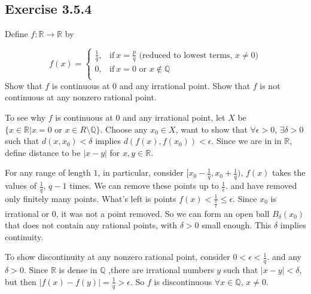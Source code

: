 \documentclass{tufte-book}
\theoremstyle{mytheoremstyle}
\theoremstyle{mylemstyle}
\theoremstyle{mydefstyle}
\begin{document}
\subsection{Exercise 3.5.4}
Define $f: \mathbb{R} \rightarrow \mathbb{R}$ by 

\[f(x) = 
\begin{cases}
      \frac{1}{q},  & \text{if}\ x = \frac{p}{q} \text{ (reduced to lowest terms,  } x \neq 0 \text{)} \\
      0, & \text{if}\ x = 0 \text{ or } x \not\in \mathbb{Q}\\
\end{cases}
\]
Show that $f$ is continuous at $0$ and any irrational point.  Show that $f$ is not continuous at any nonzero rational point.

To see why $f$ is continuous at $0$ and any irrational point, let $X$ be $\{x \in \mathbb{R} | x =0 \text{ or } x \in R \setminus \mathbb{Q}\}$.  Choose any $x_0 \in X$, want to show that $\forall \epsilon >0$, $\exists \delta > 0$ such that $d(x, x_0) < \delta$ implies $d(f(x), f(x_0)) < \epsilon$.  Since we are in in $\mathbb{R}$, define distance to be $|x - y|$ for $x, y \in \mathbb{R}$.

For any range of length $1$, in particular, consider $[x_0-\frac{1}{q}, x_0+\frac{1}{q})$, $f(x)$ takes the values of $\frac{1}{q}$, $q -1$ times.  We can remove these points up to $\frac{1}{\epsilon}$. and have removed only finitely many points.  What's left is points $f(x) < \frac{1}{\frac{1}{\epsilon}} \leq \epsilon$.  Since $x_0$ is irrational or $0$, it was not a point removed.  So we can form an open ball $B_\delta(x_0)$ that does not contain any rational points, with $\delta >0$ small enough.  This $\delta$ implies continuity.

To show discontinuity at any nonzero rational point, consider $0 < \epsilon < \frac{1}{q}$.  and any $\delta > 0$.  Since $\mathbb{R}$ is dense in $\mathbb{Q}$ ,there are irrational numbers $y$ such that $|x-y| < \delta$, but then $|f(x) - f(y)| = \frac{1}{q} > \epsilon$.  So $f$ is discontinuous $\forall x \in \mathbb{Q}$, $x \neq 0$.
\end{document}

